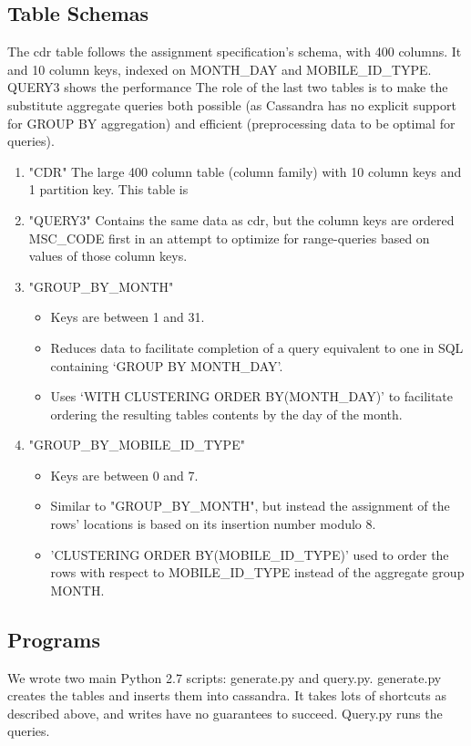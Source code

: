 \documentclass[letterpaper]{article}
\begin{document}
\subsection{Table Schemas}
The cdr table follows the assignment specification's schema, with 400 columns.
It 
and 10 column keys, indexed on MONTH\_DAY and MOBILE\_ID\_TYPE. QUERY3 shows the
performance 
The role of the last two
tables is to make the substitute
aggregate queries both possible (as Cassandra has no
explicit support for GROUP BY aggregation) and
efficient (preprocessing data to be optimal for
queries).
\begin{enumerate}
	\item "CDR"
		The large 400 column table (column family) with 10
		column keys and 1 partition key. This table is 

	\item "QUERY3"
		Contains the same data as cdr, but the column keys are
		ordered MSC\_CODE first in an attempt to optimize for
		range-queries based on values of those column keys.
	\item "GROUP\_BY\_MONTH" 
		\begin{itemize}
			\item Keys are between 1 and 31.
			\item Reduces data to facilitate completion of
				a query equivalent to one in SQL
				containing `GROUP BY MONTH\_DAY'.
			\item Uses `WITH CLUSTERING ORDER
				BY(MONTH\_DAY)' to facilitate ordering
				the resulting tables contents by the
				day of the month.  
		\end{itemize}
	\item "GROUP\_BY\_MOBILE\_ID\_TYPE"
		\begin{itemize}
			\item Keys are between 0 and 7.
			\item Similar to "GROUP\_BY\_MONTH", but instead
				the assignment of the rows' locations
				is based on its insertion number modulo
				8.
			\item 'CLUSTERING ORDER BY(MOBILE\_ID\_TYPE)'
				used to order the rows with respect to
				MOBILE\_ID\_TYPE instead of the aggregate
				group MONTH.
		\end{itemize}
\end{enumerate}

\subsection{Programs}
We wrote two main Python 2.7 scripts: generate.py and query.py. generate.py
creates the tables and inserts them into cassandra. It takes lots of shortcuts
as described above, and writes have no guarantees to succeed. Query.py runs 
the queries.
\end{document}
